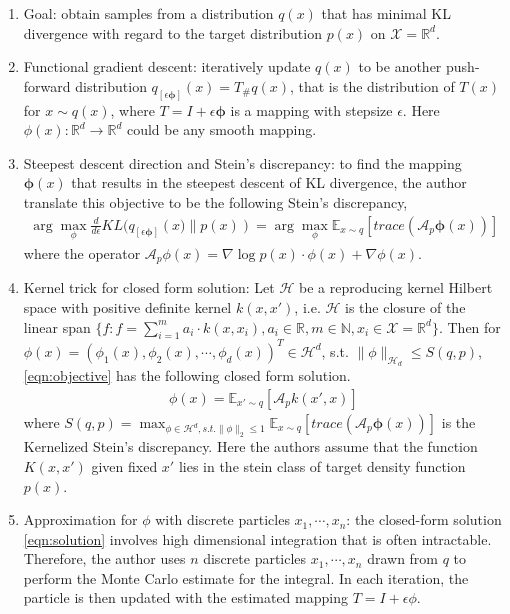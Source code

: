 \begin{enumerate}
    \item Goal: obtain samples from a distribution $q(x)$ that has minimal KL divergence with regard to the target distribution $p(x)$ on $\mathcal{X}=\mathbb{R}^d$.
    \item Functional gradient descent: iteratively update $q(x)$ to be another push-forward distribution $q_{[\epsilon\mathbf{\phi}]}(x) = T_{\#}q(x)$, that is the distribution of $T(x)$ for $x\sim q(x)$, where $T= I + \epsilon \mathbf{\phi}$ is a mapping with stepsize $\epsilon$. Here $\phi(x): \mathbb{R}^d\rightarrow \mathbb{R}^d$ could be any smooth mapping.
    \item Steepest descent direction and Stein's discrepancy: to find the mapping $\mathbf{\phi}(x)$ that results in the steepest descent of KL divergence, the author translate this objective to be the following Stein's discrepancy,
    \begin{align}
    \label{eqn:objective}
         \arg\max_\phi\frac{d}{d \epsilon}KL(q_{[\epsilon\mathbf{\phi}]}\left(x)\lVert p(x)\right) = \arg\max_\phi \mathbb{E}_{x\sim q}\left[trace\left(\mathcal{A}_p \mathbf{\phi}(x)\right)\right]
    \end{align}
    where the operator $\mathcal{A}_p \phi(x)= \nabla \log p(x) \cdot \phi(x) + \nabla\phi(x)$.
    \item Kernel trick for closed form solution: Let $\mathcal{H}$ be a reproducing kernel Hilbert space with positive definite kernel $k(x,x')$, i.e. $\mathcal{H}$ is the closure of the linear span $\{f: f = \sum_{i=1}^m a_i \cdot k(x, x_i), a_i\in \mathbb{R}, m\in \mathbb{N}, x_i\in \mathcal{X}=\mathbb{R}^d \}$. Then for $\phi(x) = \left(\phi_1(x), \phi_2(x), \cdots, \phi_d(x)\right)^T \in \mathcal{H}^d$, s.t. $\lVert\phi\rVert_{\mathcal{H}_d}\leq S(q, p)$, \eqref{eqn:objective}  has the following closed form solution.
    \begin{align}
    \label{eqn:solution}
        \phi(x) = \mathbb{E}_{x'\sim q}\left[ \mathcal{A}_p k(x', x) \right]
    \end{align}
    where $S(q, p) = \max_{\phi\in \mathcal{H}^d, s.t. \lVert\phi\rVert_2\leq 1} \mathbb{E}_{x\sim q}\left[trace\left(\mathcal{A}_p \mathbf{\phi}(x)\right)\right]$ is the Kernelized Stein's discrepancy. Here the authors assume that the function $K(x, x')$ given fixed $x'$ lies in the stein class of target density function $p(x)$.
    \item Approximation for $\phi$ with discrete particles $x_1, \cdots, x_n$: the closed-form solution \eqref{eqn:solution} involves high dimensional integration that is often intractable. Therefore, the author uses $n$ discrete particles $x_1, \cdots, x_n$ drawn from $q$ to perform the Monte Carlo estimate for the integral. In each iteration, the particle is then updated with the estimated mapping $T = I + \epsilon \phi$.
\end{enumerate}


